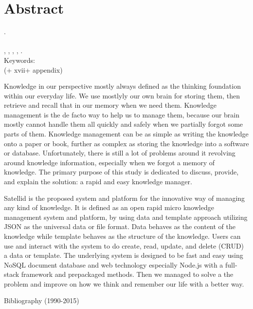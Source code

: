 
\begingroup
\let\clearpage\relax
\let\cleardoublepage\relax

\label{chap:abstract}
\chapter{Abstract}

\myName. \myNPM \\
\myDepTitle \\
\myThesisType, \myDepartmentLong, \myFacultyLong, \myUni, \myYear. \\
Keywords: \myKeywords \\
(+ xvii+ appendix)

\hfill

Knowledge in our perspective mostly always defined as the thinking foundation within our everyday life.
We use mostlyly our own brain for storing them, then retrieve and recall that in our memory when we need them.
Knowledge management is the de facto way to help us to manage them, because our brain mostly cannot handle them all quickly and safely when we partially forgot some parts of them.
Knowledge management can be as simple as writing the knowledge onto a paper or book, further as complex as storing the knowledge into a software or database.
Unfortunately, there is still a lot of problems around it revolving around knowledge information, especially when we forgot a memory of knowledge.
The primary purpose of this study is dedicated to discuss, provide, and explain the solution:
a rapid and easy knowledge manager.

Satellid is the proposed system and platform for the innovative way of managing any kind of knowledge.
It is defined as an open rapid micro knowledge management system and platform, by using data and template approach utilizing JSON as the universal data or file format.
Data behaves as the content of the knowledge while template behaves as the structure of the knowledge.
Users can use and interact with the system to do create, read, update, and delete (CRUD) a data or template.
The underlying system is designed to be fast and easy using NoSQL document database and web technology especially Node.js with a full-stack framework and prepackaged methods.
Then we managed to solve a the problem and improve on how we think and remember our life with a better way.

\hfill

\noindent \myTitle

\noindent Bibliography (1990-2015)




\endgroup

\vfill
